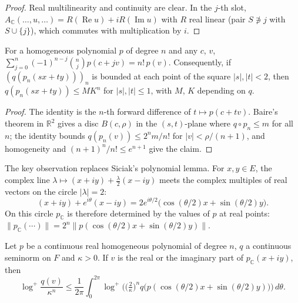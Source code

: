 \begin{proof}
  \leanok
  Real multilinearity and continuity are clear. In the $j$-th slot,
  $A_{\mathbb{C}}(\dots, u, \dots) = R(\operatorname{Re} u) + i R(\operatorname{Im} u)$ with $R$ real
  linear (pair $S \not\ni j$ with $S \cup \{j\}$), which commutes with multiplication by $i$.
\end{proof}

\begin{lemma}
  \label{lem:fwd-diff}
  \leanok
  For a homogeneous polynomial $p$ of degree $n$ and any $c$, $v$,
  $\sum_{j=0}^n (-1)^{n-j} \binom{n}{j} p(c + jv) = n!\, p(v)$. Consequently, if
  $(q(p_n(sx + ty)))_n$ is bounded at each point of the square $|s|, |t| < 2$, then
  $q(p_n(sx + ty)) \le M K^n$ for $|s|, |t| \le 1$, with $M$, $K$ depending on $q$.
\end{lemma}

\begin{proof}
  \leanok
  The identity is the $n$-th forward difference of $t \mapsto p(c + tv)$. Baire's theorem in
  $\mathbb{R}^2$ gives a disc $B(c, \rho)$ in the $(s, t)$-plane where $q \circ p_n \le m$ for
  all $n$; the identity bounds $q(p_n(v)) \le 2^n m / n!$ for $|v| < \rho/(n+1)$, and
  homogeneity and $(n+1)^n / n! \le e^{n+1}$ give the claim.
\end{proof}

The key observation replaces Siciak's polynomial lemma. For $x, y \in E$, the complex line
$\lambda \mapsto (x + iy) + \tfrac{\lambda}{2}(x - iy)$ meets the complex multiples of real
vectors on the circle $|\lambda| = 2$:
\[
  (x + iy) + e^{i\theta}(x - iy) = 2 e^{i\theta/2} \big(\cos(\theta/2) x + \sin(\theta/2) y\big).
\]
On this circle $p_{\mathbb{C}}$ is therefore determined by the values of $p$ at real points:
$\|p_{\mathbb{C}}(\cdots)\| = 2^n \|p(\cos(\theta/2) x + \sin(\theta/2) y)\|$.

\begin{lemma}
  \label{lem:jensen-aux-line}
  \leanok
  Let $p$ be a continuous real homogeneous polynomial of degree $n$, $q$ a continuous seminorm on
  $F$ and $\kappa > 0$. If $v$ is the real or the imaginary part of $p_{\mathbb{C}}(x + iy)$, then
  \[
    \log^+ \frac{q(v)}{\kappa^n} \le \frac{1}{2\pi} \int_0^{2\pi}
      \log^+ \Big( \big(\tfrac{2}{\kappa}\big)^n q\big(p(\cos(\theta/2) x + \sin(\theta/2) y)\big)
      \Big) \, d\theta .
  \]
\end{lemma}


